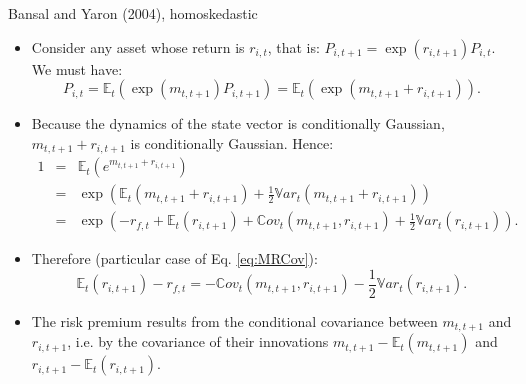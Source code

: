 \begin{frame}{Bansal and Yaron (2004), homoskedastic}
\begin{footnotesize}
\begin{itemize}
	\item Consider any asset whose return is $r_{i,t}$, that is: $P_{i,t+1} = \exp(r_{i,t+1})P_{i,t}$. We must have:
	$$
	P_{i,t} = \mathbb{E}_t(\exp(m_{t,t+1})P_{i,t+1})= \mathbb{E}_t(\exp(m_{t,t+1}+r_{i,t+1})).
	$$
	\item Because the dynamics of the state vector is conditionally Gaussian, $m_{t,t+1}+r_{i,t+1}$ is conditionally Gaussian. Hence:
	\begin{eqnarray*}
	 1&=&\mathbb{E}_t\left(e^{m_{t,t+1}+r_{i,t+1}}\right)\\
	 &=&  \exp\left(\mathbb{E}_t(m_{t,t+1}+r_{i,t+1}) + \frac{1}{2}\mathbb{V}ar_t(m_{t,t+1}+r_{i,t+1})\right)\\
	 &=&  \exp\left(-r_{f,t}+\mathbb{E}_t(r_{i,t+1}) + \mathbb{C}ov_t(m_{t,t+1},r_{i,t+1}) + \frac{1}{2}\mathbb{V}ar_t(r_{i,t+1})\right).
	\end{eqnarray*}
	\item Therefore (particular case of  Eq. \ref{eq:MRCov}):
	\begin{equation}\label{eq:rp_cond}
	\mathbb{E}_t(r_{i,t+1}) -r_{f,t} = - \mathbb{C}ov_t(m_{t,t+1},r_{i,t+1}) - \frac{1}{2}\mathbb{V}ar_t(r_{i,t+1}).
	\end{equation}
	\item The risk premium results from the conditional covariance between $m_{t,t+1}$ and $r_{i,t+1}$, i.e. by the covariance of their innovations $m_{t,t+1} - \mathbb{E}_t(m_{t,t+1})$ and $r_{i,t+1} - \mathbb{E}_t(r_{i,t+1})$.
\end{itemize}
\end{footnotesize}
\end{frame}

